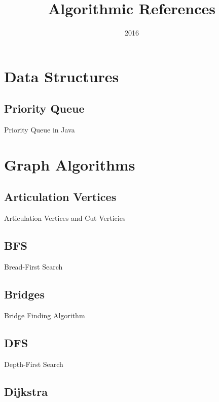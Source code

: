 \documentclass[10pt,oneside]{memoir}
\title{Algorithmic References}
\date{2016}
\makeatletter
\def\maketitle{%
  \null
  \thispagestyle{empty}%
  \vfill
  \begin{center}\leavevmode
    \normalfont
    {\LARGE\raggedleft \@author\par}%
    \hrulefill\par
    {\huge\raggedright \@title\par}%
    \vskip 1cm
  \end{center}%
  \vfill
  \null
  \cleardoublepage
  }
\makeatother
\begin{document}
\let\cleardoublepage\clearpage

\maketitle

\mainmatter

\begingroup
\let\cleardoublepage\clearpage
\tableofcontents
\endgroup

\chapter{Data Structures}

    \section{Priority Queue}

    Priority Queue in Java



\chapter{Graph Algorithms}

    \section{Articulation Vertices}

    Articulation Vertices and Cut Verticies

    \section{BFS}

    Bread-First Search

    \section{Bridges}

    Bridge Finding Algorithm

    \section{DFS}

    Depth-First Search

    \section{Dijkstra}
\end{document}
